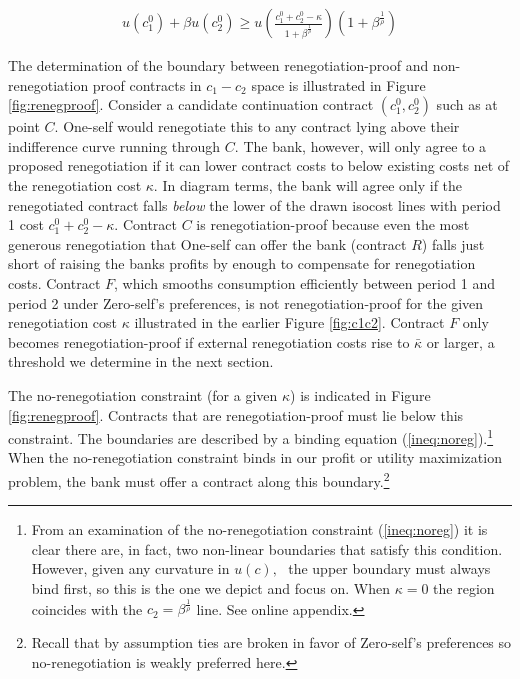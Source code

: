 \documentclass[11pt,english]{article}
\theoremstyle{plain}
\theoremstyle{definition}
\begin{document}
\begin{align}
u(c_{1}^{0})+\beta u(c_{2}^{0})\ge u\left(\frac{c_{1}^{0}+c_{2}^{0}-\kappa}{1+\beta^{\frac{1}{\rho}}}\right)(1+\beta^{\frac{1}{\rho}})\label{ineq:noreg}
\end{align}

The determination of the boundary between renegotiation-proof and
non-renegotiation proof contracts in $c_{1}-c_{2}$ space is illustrated
in Figure \ref{fig:renegproof}. Consider a candidate continuation
contract $(c_{1}^{0},c_{2}^{0})$ such as at point $C$. One-self
would renegotiate this to any contract lying above their indifference
curve running through $C$. The bank, however, will only agree to a
proposed renegotiation if it can lower contract costs to below existing
costs net of the renegotiation cost $\kappa.$ In diagram terms, the
bank will agree only if the renegotiated contract falls \textit{below}
the lower of the drawn isocost lines with period 1 cost $c_{1}^{0}+c_{2}^{0}-\kappa$.
Contract $C$ is renegotiation-proof because even the most
generous renegotiation that One-self can offer the bank (contract
$R$) falls just short of raising the banks profits by enough to compensate for renegotiation costs. Contract $F$, which smooths consumption
efficiently between period 1 and period 2 under Zero-self's preferences,
is not renegotiation-proof for the given renegotiation cost $\kappa$
illustrated in the earlier Figure \ref{fig:c1c2}. Contract $F$ only becomes renegotiation-proof if external renegotiation costs
rise to $\bar{\kappa}$ or larger, a threshold we determine 
in the next section. 

The no-renegotiation constraint (for a given $\kappa$) is indicated
in Figure \ref{fig:renegproof}. Contracts that are renegotiation-proof must lie below this constraint. The boundaries are described
by a binding equation (\ref{ineq:noreg}).\footnote{From  an examination of the no-renegotiation constraint
(\ref{ineq:noreg}) it is clear there are, in fact, two non-linear boundaries that satisfy this condition. However, given any curvature in \(u(c), \text{ } \)the upper boundary must always bind first, so this is the one we depict and focus on.
When $\kappa=0$ the region coincides with the $c_{2}=\beta^{\frac{1}{\rho}}$
line. See online appendix.} When the no-renegotiation
constraint binds in our profit or utility maximization problem, the
bank must offer a contract along this boundary.\footnote{Recall that by assumption ties are broken in favor of Zero-self's
preferences so no-renegotiation is weakly preferred here. } 
\end{document}
